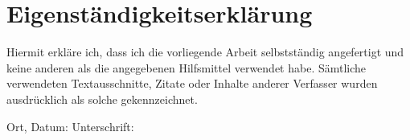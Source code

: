 \newpage
\section*{Eigenständigkeitserklärung}
Hiermit erkläre ich, dass ich die vorliegende Arbeit selbstständig angefertigt und keine anderen als die
angegebenen Hilfsmittel verwendet habe. Sämtliche verwendeten Textausschnitte, Zitate oder Inhalte anderer Verfasser wurden ausdrücklich als solche gekennzeichnet.\\
\vspace{40pt}

Ort, Datum: \hspace{8cm} Unterschrift:


\newpage